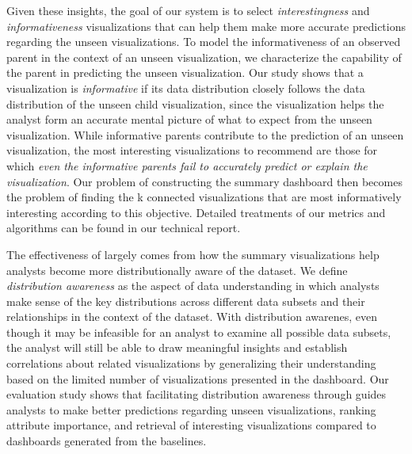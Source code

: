 \par Given these insights, the goal of our system is to select \textit{interestingness} and \textit{informativeness} visualizations that can help them make more accurate predictions regarding the unseen visualizations. To model the informativeness of an observed parent in the context of an unseen visualization, we characterize the capability of the parent in predicting the unseen visualization. Our study shows that a visualization is \emph{informative} if its data distribution closely follows the data distribution of the unseen child visualization, since the visualization helps the analyst form an accurate mental picture of what to expect from the unseen visualization. While informative parents contribute to the prediction of an unseen visualization, the most interesting visualizations to recommend are those for which \emph{even the informative parents fail to accurately predict or explain the visualization}. Our problem of constructing the summary dashboard then becomes the problem of finding the k connected visualizations that are most informatively interesting according to this objective. Detailed treatments of our metrics and algorithms can be found in our technical report. 
\par The effectiveness of \sbd largely comes from how the summary visualizations help analysts become more distributionally aware of the dataset. We define \emph{distribution awareness} as the aspect of data understanding in which analysts make sense of the key distributions across different data subsets and their relationships in the context of the dataset. With distribution awarenes, even though it may be infeasible for an analyst to examine all possible data subsets, the analyst will still be able to draw meaningful insights and establish correlations about related visualizations by generalizing their understanding based on the limited number of visualizations presented in the dashboard. Our evaluation study shows that facilitating distribution awareness through \sbd guides analysts to make better predictions regarding unseen visualizations, ranking attribute importance, and retrieval of interesting visualizations compared to dashboards generated from the baselines. %
